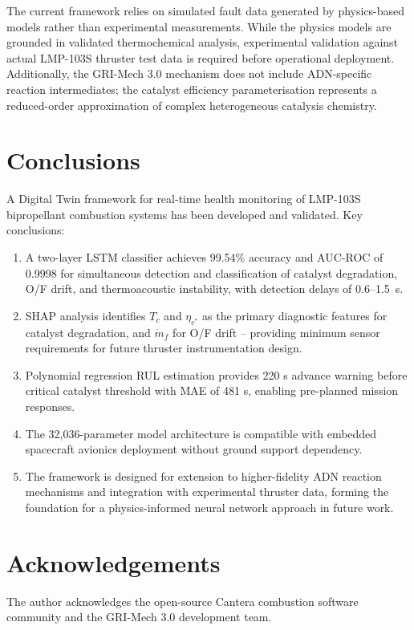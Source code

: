 \documentclass[]{aiaa-tc}
\begin{document}
The current framework relies on simulated fault data
generated by physics-based models rather than
experimental measurements. While the physics models
are grounded in validated thermochemical analysis,
experimental validation against actual LMP-103S
thruster test data is required before operational
deployment. Additionally, the GRI-Mech 3.0 mechanism
does not include ADN-specific reaction intermediates;
the catalyst efficiency parameterisation represents
a reduced-order approximation of complex heterogeneous
catalysis chemistry.

\section{Conclusions}

A Digital Twin framework for real-time health monitoring
of LMP-103S bipropellant combustion systems has been
developed and validated. Key conclusions:

\begin{enumerate}
\item A two-layer LSTM classifier achieves 99.54\%
accuracy and AUC-ROC of 0.9998 for simultaneous
detection and classification of catalyst degradation,
O/F drift, and thermoacoustic instability, with
detection delays of 0.6--1.5~s.

\item SHAP analysis identifies $T_c$ and $\eta_{c^*}$
as the primary diagnostic features for catalyst
degradation, and $\dot{m}_f$ for O/F drift --
providing minimum sensor requirements for future
thruster instrumentation design.

\item Polynomial regression RUL estimation provides 220 s advance warning before critical catalyst
threshold with MAE of 481 s, enabling pre-planned
mission responses.

\item The 32,036-parameter model architecture is
compatible with embedded spacecraft avionics
deployment without ground support dependency.

\item The framework is designed for extension to
higher-fidelity ADN reaction mechanisms and
integration with experimental thruster data,
forming the foundation for a physics-informed
neural network approach in future work.
\end{enumerate}

\section*{Acknowledgements}
The author acknowledges the open-source Cantera
combustion software community and the GRI-Mech 3.0
development team.
\end{document}
